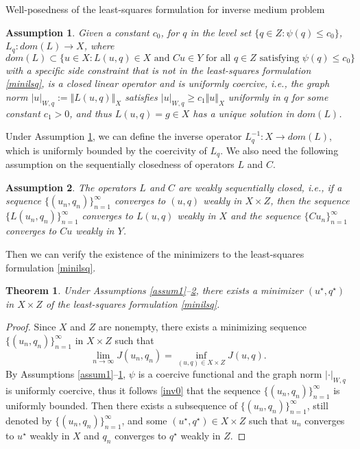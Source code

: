 \documentclass[11pt]{article}%
\renewcommand{\_}{{\fontfamily{ptm}\selectfont\textunderscore}}
\theoremstyle{plain}
\numberwithin{equation}{section}
\newtheorem{theorem*}{Theorem}
\newtheorem{assumption}{Assumption}
\begin{document}
\begin{section}{Well-posedness of the least-squares formulation for inverse medium problem}
\begin{assumption}\label{assum2}
Given a constant $c_0$, for $q$ in the level set $\{q\in Z :\psi(q)\le c_0\}$, $L_q: dom(L)\to X$, where $dom(L)\subset\{u\in X:L(u,q)\in X \text{ and }Cu\in Y \text{ for all }q\in Z\text{ satisfying } \psi(q)\leq c_0\}$ with a specific side constraint that is not in the least-squares formulation \eqref{minilsq}, is a closed linear operator and is uniformly coercive, i.e., the graph norm $|u|_{W,q}:=\Vert L(u,q)\Vert_X$ satisfies $|u|_{W,q}\geq c_1\Vert u\Vert_X$ uniformly in $q$ for some constant $c_1>0$, and thus $L(u, q)=g\in X$ has a unique solution in $dom(L)$.
\end{assumption}

Under Assumption \ref{assum2}, we can define the inverse operator $L_q^{-1}:X\to dom(L)$, which is uniformly bounded by the coercivity of $L_q$. We also need the following assumption on the sequentially closedness of operators $L$ and $C$.
\begin{assumption}\label{assumLC}
 The operators $L$ and $C$ are weakly sequentially closed, i.e., if a sequence $\{(u_n,q_n)\}_{n=1}^\infty$ converges to $(u, q)$ weakly in $X\times Z$, then the sequence $\{L(u_n,q_n)\}_{n=1}^\infty$ converges to $L(u, q)$ weakly in $X$ and the sequence 
 $\{Cu_n\}_{n=1}^\infty$ converges to $C u$ weakly in $Y$.
\end{assumption}
Then we can verify the existence of the minimizers to the least-squares formulation \eqref{minilsq}.
\begin{theorem*}\label{exist}
Under Assumptions \ref{assum1}--\ref{assumLC}, there exists a minimizer $(u^\star, q^\star)$ in $X\times Z$ of the least-squares formulation \eqref{minilsq}.
\end{theorem*}
\begin{proof}
Since $X$ and $Z$ are nonempty, 
there exists a minimizing sequence $\{(u_n,q_n)\}_{n=1}^\infty$ in $X\times Z$ such that 
\begin{equation}
\lim_{n\to\infty} J(u_n,q_n) =\inf_{(u,q)\in X\times Z}J(u,q).\label{liminf}
\end{equation}
By Assumptions \ref{assum1}--\ref{assum2}, $\psi$ is a coercive functional and the graph norm $|\cdot|_{W,q}$ 
is uniformly coercive, thus it follows \eqref{inv0} that the sequence $\{(u_n,q_n)\}_{n=1}^\infty$ is uniformly bounded. Then there exists a subsequence of $\{(u_n,q_n)\}_{n=1}^\infty$, still denoted by $\{(u_n,q_n)\}_{n=1}^\infty$, and some $(u^\star, q^\star)\in X\times Z$ such that $u_n$ converges to $u^\star$ weakly in $X$ and $q_n$ converges to $q^\star$ weakly in $Z$. 

\end{proof}
\end{section}
\end{document}
